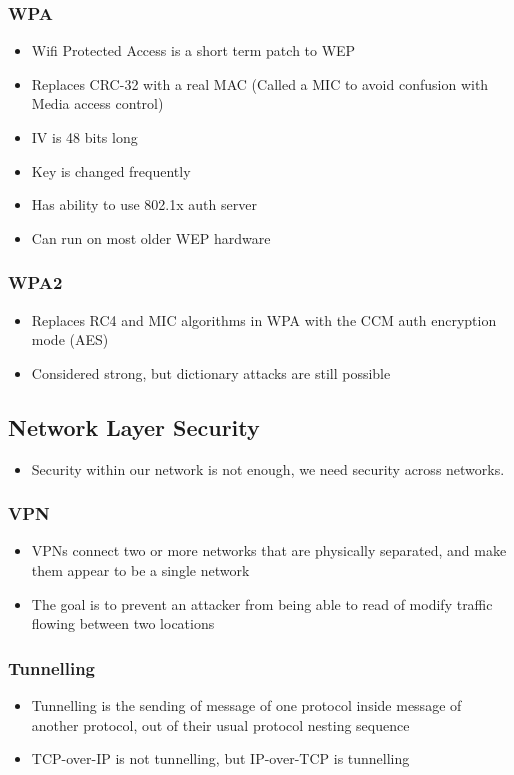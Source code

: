 \documentclass[twoside]{article}
\begin{document}
\subsubsection{WPA}
\begin{itemize}
\item Wifi Protected Access is a short term patch to WEP
\item Replaces CRC-32 with a real MAC (Called a MIC to avoid confusion with Media access control)
\item IV is 48 bits long
\item Key is changed frequently 
\item Has ability to use 802.1x auth server
\item Can run on most older WEP hardware
\end{itemize}

\subsubsection{WPA2}
\begin{itemize}
\item Replaces RC4 and MIC algorithms in WPA with the CCM auth encryption mode (AES)
\item Considered strong, but dictionary attacks are still possible
\end{itemize}

\subsection{Network Layer Security}
\begin{itemize}
\item Security within our network is not enough, we need security across networks. 
\end{itemize}

\subsubsection{VPN}
\begin{itemize}
\item VPNs connect two or more networks that are physically separated, and make them appear to be a single network
\item The goal is to prevent an attacker from being able to read of modify traffic flowing between two locations
\end{itemize}

\subsubsection{Tunnelling}
\begin{itemize}
\item Tunnelling is the sending of message of one protocol inside message of another protocol, out of their usual protocol nesting sequence
\item TCP-over-IP is not tunnelling, but IP-over-TCP is tunnelling
\end{itemize}
\end{document}
